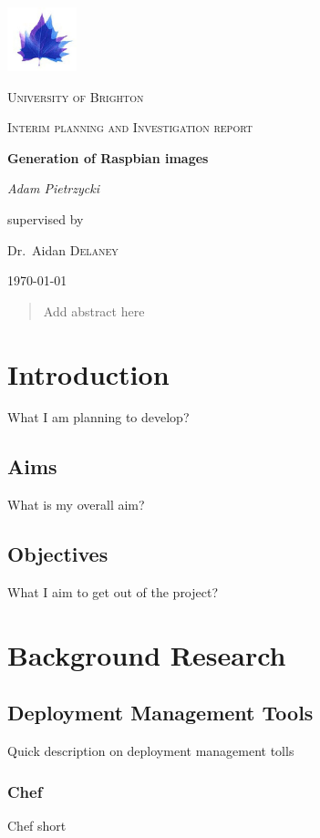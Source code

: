 \documentclass[12pt,a4paper]{report}
\begin{document}
\begin{titlepage}
	\centering
	\includegraphics[width=0.15\textwidth]{Brighton-University-logo.png}\par
	{\scshape\LARGE University of Brighton\par}
	\vspace{1cm}
	{\scshape\Large Interim planning and Investigation report\par}
	\vspace{1.5cm}
	{\huge\bfseries Generation of Raspbian images\par}
	\vspace{2cm}
	{\Large\itshape Adam Pietrzycki\par}
	\vfill
	supervised by\par
	Dr.~Aidan \textsc{Delaney}
	\vfill
	{\large \today\par}
\end{titlepage}

\begin{abstract}
Add abstract here
\end{abstract}

\pagebreak
\tableofcontents
\pagebreak

\chapter{Introduction}
What I am planning to develop?
\section{Aims}
What is my overall aim?
\section{Objectives}
What I aim to get out of the project?

\chapter{Background Research}
\section{Deployment Management Tools}
Quick description on deployment management tolls
\subsection{Chef}
Chef short
\end{document}
